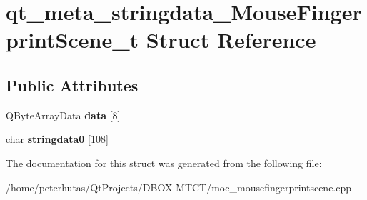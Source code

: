 \hypertarget{structqt__meta__stringdata___mouse_fingerprint_scene__t}{}\section{qt\+\_\+meta\+\_\+stringdata\+\_\+\+Mouse\+Fingerprint\+Scene\+\_\+t Struct Reference}
\label{structqt__meta__stringdata___mouse_fingerprint_scene__t}
\subsection*{Public Attributes}
\begin{DoxyCompactItemize}
\item 
\mbox{\label{structqt__meta__stringdata___mouse_fingerprint_scene__t_aca5670fef0324379f26c476407ab7084}} 
Q\+Byte\+Array\+Data {\bfseries data} \mbox{[}8\mbox{]}
\item 
\mbox{\label{structqt__meta__stringdata___mouse_fingerprint_scene__t_aef703492fad6a1dbae153f1c0c69baaf}} 
char {\bfseries stringdata0} \mbox{[}108\mbox{]}
\end{DoxyCompactItemize}


The documentation for this struct was generated from the following file\+:\begin{DoxyCompactItemize}
\item 
/home/peterhutas/\+Qt\+Projects/\+D\+B\+O\+X-\/\+M\+T\+C\+T/moc\+\_\+mousefingerprintscene.\+cpp\end{DoxyCompactItemize}
